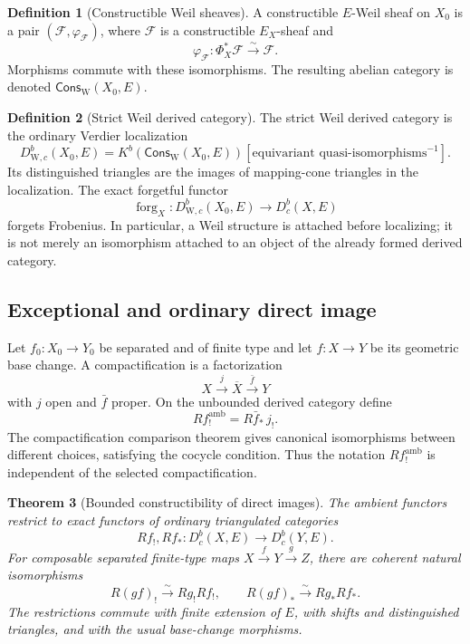 \documentclass[10pt]{article}
\newtheorem{theorem}{Theorem}[section]
\theoremstyle{definition}
\newtheorem{definition}[theorem]{Definition}
\newcommand{\Dbc}{D^b_c}
\newcommand{\DW}{D^b_{\mathrm W,c}}
\begin{document}
\begin{definition}[Constructible Weil sheaves]
A constructible \(E\)-Weil sheaf on \(X_0\) is a pair
\((\mathcal F,\varphi_{\mathcal F})\), where \(\mathcal F\) is a
constructible \(E_X\)-sheaf and
\[
             \varphi_{\mathcal F}:\Phi_X^*\mathcal F
                         \xrightarrow{\sim}\mathcal F.
\]
Morphisms commute with these isomorphisms.  The resulting abelian category
is denoted \(\mathsf{Cons}_{\mathrm W}(X_0,E)\).
\end{definition}

\begin{definition}[Strict Weil derived category]
The strict Weil derived category is the ordinary Verdier localization
\[
 \DW(X_0,E)=
 K^b(\mathsf{Cons}_{\mathrm W}(X_0,E))
 [\text{equivariant quasi-isomorphisms}^{-1}].
\]
Its distinguished triangles are the images of mapping-cone triangles in
the localization.  The exact forgetful functor
\[
       \operatorname{forg}_X:\DW(X_0,E)\longrightarrow\Dbc(X,E)
\]
forgets Frobenius.  In particular, a Weil structure is attached before
localizing; it is not merely an isomorphism attached to an object of the
already formed derived category.
\end{definition}

\subsection{Exceptional and ordinary direct image}

Let \(f_0:X_0\to Y_0\) be separated and of finite type and let
\(f:X\to Y\) be its geometric base change.  A compactification is a
factorization
\[
                 X\xrightarrow{j}\overline X\xrightarrow{\bar f}Y
\]
with \(j\) open and \(\bar f\) proper.  On the unbounded derived category
define
\[
                Rf_!^{\mathrm{amb}}=R\bar f_*\,j_!.
\]
The compactification comparison theorem gives canonical isomorphisms
between different choices, satisfying the cocycle condition.  Thus the
notation \(Rf_!^{\mathrm{amb}}\) is independent of the selected
compactification.

\begin{theorem}[Bounded constructibility of direct images]
The ambient functors restrict to exact functors of ordinary triangulated
categories
\[
 Rf_!,Rf_*:\Dbc(X,E)\longrightarrow\Dbc(Y,E).
\]
For composable separated finite-type maps \(X\xrightarrow fY\xrightarrow gZ\),
there are coherent natural isomorphisms
\[
 R(gf)_!\xrightarrow{\sim}Rg_!Rf_!,\qquad
 R(gf)_*\xrightarrow{\sim}Rg_*Rf_*.
\]
The restrictions commute with finite extension of \(E\), with shifts and
distinguished triangles, and with the usual base-change morphisms.
\end{theorem}
\end{document}
